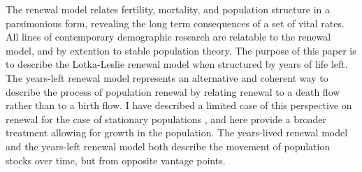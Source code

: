 \documentclass[12pt,oneside,a4paper,leqno]{article}
\begin{document}
The renewal model relates
fertility, mortality, and population structure in a parsimonious form, revealing
the long term consequences of a set of vital rates. All lines
of contemporary demographic research are relatable to the renewal model, and by
extention to stable population theory. The purpose of this paper is to describe
the Lotka-Leslie renewal model when structured by years of life left.
The years-left renewal model represents an alternative and coherent way to
describe the process of population renewal by relating renewal to a death flow
rather than to a birth flow. I have described a limited case of this
perspective on renewal for the case of stationary populations
\citep{riffe2015force}, and here provide a broader treatment allowing for
growth in the population.
The years-lived renewal model and the years-left renewal
model both describe the movement of population stocks over time, but from opposite vantage points. %
\end{document}
